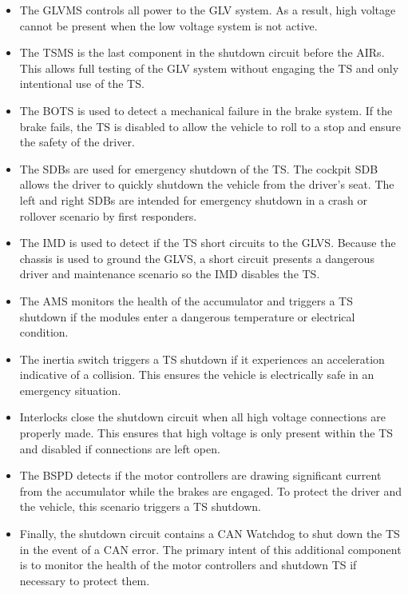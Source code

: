 \documentclass{article}
\begin{document}
                \begin{itemize}
                    \item The GLVMS controls all power to the GLV system. As a result, high voltage cannot be present when the low voltage system is not active.
                    \item The TSMS is the last component in the shutdown circuit before the AIRs. This allows full testing of the GLV system without engaging the TS and only intentional use of the TS.
                    \item The BOTS is used to detect a mechanical failure in the brake system. If the brake fails, the TS is disabled to allow the vehicle to roll to a stop and ensure the safety of the driver.
                    \item The SDBs are used for emergency shutdown of the TS. The cockpit SDB allows the driver to quickly shutdown the vehicle from the driver's seat. The left and right SDBs are intended for emergency shutdown in a crash or rollover scenario by first responders.
                    \item The IMD is used to detect if the TS short circuits to the GLVS. Because the chassis is used to ground the GLVS, a short circuit presents a dangerous driver and maintenance scenario so the IMD disables the TS.
                    \item The AMS monitors the health of the accumulator and triggers a TS shutdown if the modules enter a dangerous temperature or electrical condition. 
                    \item The inertia switch triggers a TS shutdown if it experiences an acceleration indicative of a collision. This ensures the vehicle is electrically safe in an emergency situation.
                    \item Interlocks close the shutdown circuit when all high voltage connections are properly made. This ensures that high voltage is only present within the TS and disabled if connections are left open.
                    \item The BSPD detects if the motor controllers are drawing significant current from the accumulator while the brakes are engaged. To protect the driver and the vehicle, this scenario triggers a TS shutdown.
                    \item Finally, the shutdown circuit contains a CAN Watchdog to shut down the TS in the event of a CAN error. The primary intent of this additional component is to monitor the health of the motor controllers and shutdown TS if necessary to protect them.
                \end{itemize}
                
\end{document}
